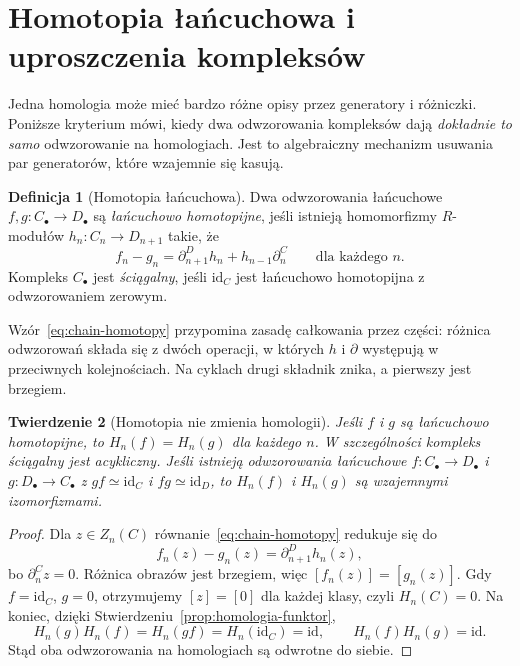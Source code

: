 \documentclass[11pt,a4paper,oneside]{report}
\newcommand{\id}{\mathrm{id}}
\theoremstyle{plain}
\newtheorem{twierdzenie}{Twierdzenie}[section]
\theoremstyle{definition}
\newtheorem{definicja}[twierdzenie]{Definicja}
\theoremstyle{remark}
\begin{document}
\section{Homotopia łańcuchowa i uproszczenia kompleksów}
\label{sec:homotopia-lancuchowa}

Jedna homologia może mieć bardzo różne opisy
przez generatory i różniczki. Poniższe kryterium
mówi, kiedy dwa odwzorowania kompleksów dają
\emph{dokładnie to samo} odwzorowanie na
homologiach. Jest to algebraiczny mechanizm
usuwania par generatorów, które wzajemnie
się kasują.

\begin{definicja}[Homotopia łańcuchowa]
\label{def:homotopia-lancuchowa}
Dwa odwzorowania łańcuchowe $f,g:C_\bullet\to D_\bullet$
są \emph{łańcuchowo homotopijne}, jeśli istnieją
homomorfizmy $R$-modułów $h_n:C_n\to D_{n+1}$ takie, że
\begin{equation}\label{eq:chain-homotopy}
 f_n-g_n=\partial^D_{n+1}h_n+h_{n-1}\partial^C_n
 \qquad\text{dla każdego }n.
\end{equation}
Kompleks $C_\bullet$ jest \emph{ściągalny},
jeśli $\id_C$ jest łańcuchowo homotopijna
z odwzorowaniem zerowym.
\end{definicja}

Wzór~\eqref{eq:chain-homotopy} przypomina
zasadę całkowania przez części: różnica
odwzorowań składa się z dwóch operacji, w których
$h$ i $\partial$ występują w przeciwnych
kolejnościach. Na cyklach drugi składnik
znika, a pierwszy jest brzegiem.

\begin{twierdzenie}[Homotopia nie zmienia homologii]
\label{thm:homotopia-homologia}
Jeśli $f$ i $g$ są łańcuchowo homotopijne,
to $H_n(f)=H_n(g)$ dla każdego $n$.
W szczególności kompleks ściągalny jest
acykliczny. Jeśli istnieją odwzorowania łańcuchowe
$f:C_\bullet\to D_\bullet$ i
$g:D_\bullet\to C_\bullet$ z
$gf\simeq\id_C$ i $fg\simeq\id_D$,
to $H_n(f)$ i $H_n(g)$ są wzajemnymi
izomorfizmami.
\end{twierdzenie}
\begin{proof}
Dla $z\in Z_n(C)$ równanie~\eqref{eq:chain-homotopy}
redukuje się do
\[
 f_n(z)-g_n(z)=\partial^D_{n+1}h_n(z),
\]
bo $\partial^C_nz=0$. Różnica obrazów jest
brzegiem, więc $[f_n(z)]=[g_n(z)]$.
Gdy $f=\id_C$, $g=0$, otrzymujemy
$[z]=[0]$ dla każdej klasy, czyli
$H_n(C)=0$.
Na koniec, dzięki
Stwierdzeniu~\ref{prop:homologia-funktor},
\[
 H_n(g)H_n(f)=H_n(gf)
 =H_n(\id_C)=\id,\qquad
 H_n(f)H_n(g)=\id.
\]
Stąd oba odwzorowania na homologiach są
odwrotne do siebie.
\end{proof}
\end{document}
